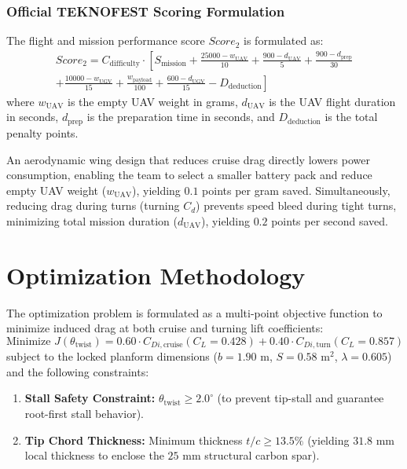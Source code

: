 \documentclass[11pt]{article}
\begin{document}
\subsubsection{Official TEKNOFEST Scoring Formulation}
The flight and mission performance score $Score_2$ is formulated as:
\begin{equation}
\begin{split}
    Score_2 = C_{\text{difficulty}} \cdot \left[ S_{\text{mission}} + \frac{25000 - w_{\text{UAV}}}{10} + \frac{900 - d_{\text{UAV}}}{5} + \frac{900 - d_{\text{prep}}}{30} \right. \\
    \left. + \frac{10000 - w_{\text{UGV}}}{15} + \frac{w_{\text{payload}}}{100} + \frac{600 - d_{\text{UGV}}}{15} - D_{\text{deduction}} \right]
\end{split}
\end{equation}
where $w_{\text{UAV}}$ is the empty UAV weight in grams, $d_{\text{UAV}}$ is the UAV flight duration in seconds, $d_{\text{prep}}$ is the preparation time in seconds, and $D_{\text{deduction}}$ is the total penalty points. 

An aerodynamic wing design that reduces cruise drag directly lowers power consumption, enabling the team to select a smaller battery pack and reduce empty UAV weight ($w_{\text{UAV}}$), yielding $0.1$ points per gram saved. Simultaneously, reducing drag during turns (turning $C_d$) prevents speed bleed during tight turns, minimizing total mission duration ($d_{\text{UAV}}$), yielding $0.2$ points per second saved.

\section{Optimization Methodology}
The optimization problem is formulated as a multi-point objective function to minimize induced drag at both cruise and turning lift coefficients:
\begin{equation}
    \text{Minimize } J(\theta_{\text{twist}}) = 0.60 \cdot C_{Di,\text{cruise}} (C_L = 0.428) + 0.40 \cdot C_{Di,\text{turn}} (C_L = 0.857)
\end{equation}
subject to the locked planform dimensions ($b = 1.90\text{ m}$, $S = 0.58\text{ m}^2$, $\lambda = 0.605$) and the following constraints:
\begin{enumerate}
    \item \textbf{Stall Safety Constraint:} $\theta_{\text{twist}} \ge 2.0^\circ$ (to prevent tip-stall and guarantee root-first stall behavior).
    \item \textbf{Tip Chord Thickness:} Minimum thickness $t/c \ge 13.5\%$ (yielding $31.8\text{ mm}$ local thickness to enclose the $25\text{ mm}$ structural carbon spar).
\end{enumerate}
\end{document}

